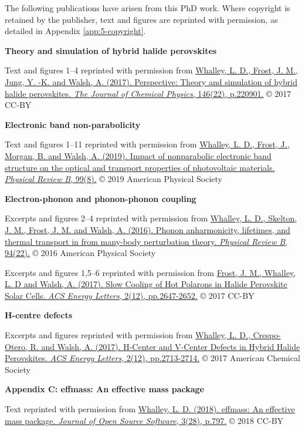 
The following publications have arisen from this PhD work. Where copyright is retained by the publisher, text and figures are reprinted with permission, as detailed in Appendix \ref{app:5-copyright}.

\vspace{\frontmatterbaselineskip}

\textbf{Theory and simulation of hybrid halide perovskites } 

Text and figures 1--4 reprinted with permission from
\href{https://doi.org/10.1063/1.4984964}{Whalley, L. D., Frost, J. M., Jung, Y. -K. and Walsh, A. (2017). Perspective: Theory and simulation of hybrid halide perovskites. \textit{The Journal of Chemical Physics}, 146(22), p.220901.} © 2017 CC-BY
\vspace{\frontmatterbaselineskip}

\textbf{Electronic band non-parabolicity}

Text and figures 1--11 reprinted with permission from
\href{https://doi.org/10.1103/PhysRevB.99.085207}{Whalley, L. D., Frost, J., Morgan, B. and Walsh, A. (2019). Impact of nonparabolic electronic band structure on the optical and transport properties of photovoltaic materials. \textit{Physical Review B}, 99(8).} © 2019 American Physical Society
\vspace{\frontmatterbaselineskip}

\textbf{Electron-phonon and phonon-phonon coupling}

Excerpts and figures 2--4 reprinted with permission from
\href{https://doi.org/10.1103/PhysRevB.94.220301}{Whalley, L. D., Skelton, J. M., Frost, J. M. and Walsh, A. (2016). Phonon anharmonicity, lifetimes, and thermal transport in  from many-body perturbation theory. \textit{Physical Review B}, 94(22).} © 2016 American Physical Society

Excerpts and figures 1,5--6 reprinted with permission from
\href{https://doi.org/10.1021/acsenergylett.7b00862}{Frost, J. M., Whalley, L. D and Walsh, A. (2017). Slow Cooling of Hot Polarons in Halide Perovskite Solar Cells. \textit{ACS Energy Letters}, 2(12), pp.2647-2652.} © 2017 CC-BY
\vspace{\frontmatterbaselineskip}

\textbf{H-centre defects}

Excerpts and figures reprinted with permission from
\href{https://doi.org/10.1021/acsenergylett.7b00995}{Whalley, L. D., Crespo-Otero, R. and Walsh, A. (2017). H-Center and V-Center Defects in Hybrid Halide Perovskites. \textit{ACS Energy Letters}, 2(12), pp.2713-2714.} © 2017 American Chemical Society 
\vspace{\frontmatterbaselineskip}

\textbf{Appendix C: effmass: An effective mass package}

Text reprinted with permission from
\href{https://doi.org/10.21105/joss.00797}{Whalley, L. D. (2018). effmass: An effective mass package. \textit{Journal of Open Source Software}, 3(28), p.797.} © 2018 CC-BY 


